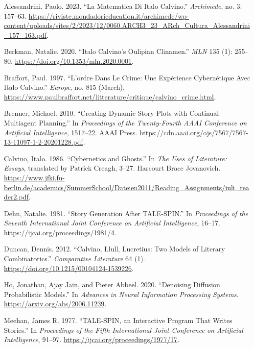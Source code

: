 \documentclass[
  11pt,
  letterpaper,
]{article}
\newlength{\cslhangindent}
\newenvironment{CSLReferences}[2] %
 {\begin{list}{}{%
  \setlength{\itemindent}{0pt}
  \setlength{\leftmargin}{0pt}
  \setlength{\parsep}{0pt}
  \ifodd #1
   \setlength{\leftmargin}{\cslhangindent}
   \setlength{\itemindent}{-1\cslhangindent}
  \fi
  \setlength{\itemsep}{#2\baselineskip}}}
 {\end{list}}
\begin{document}
\begin{CSLReferences}{1}{0}
Alessandrini, Paolo. 2023. {``La Matematica Di Italo Calvino.''}
\emph{Archimede}, no. 3: 157--63.
\url{https://riviste.mondadorieducation.it/archimede/wp-content/uploads/sites/2/2023/12/0060.ARCH3_23_ARch_Cultura_Alessandrini_157_163.pdf}.

Berkman, Natalie. 2020. {``Italo Calvino's Oulipian Clinamen.''}
\emph{MLN} 135 (1): 255--80.
\url{https://doi.org/10.1353/mln.2020.0001}.

Braffort, Paul. 1997. {``L'ordre Dans Le Crime: Une Expérience
Cybernétique Avec Italo Calvino.''} \emph{Europe}, no. 815 (March).
\url{https://www.paulbraffort.net/litterature/critique/calvino_crime.html}.

Brenner, Michael. 2010. {``Creating Dynamic Story Plots with Continual
Multiagent Planning.''} In \emph{Proceedings of the Twenty-Fourth AAAI
Conference on Artificial Intelligence}, 1517--22. AAAI Press.
\url{https://cdn.aaai.org/ojs/7567/7567-13-11097-1-2-20201228.pdf}.

Calvino, Italo. 1986. {``Cybernetics and Ghosts.''} In \emph{The Uses of
Literature: Essays}, translated by Patrick Creagh, 3--27. Harcourt Brace
Jovanovich.
\url{https://www.jfki.fu-berlin.de/academics/SummerSchool/Dateien2011/Reading_Assignments/iuli_reader2.pdf}.

Dehn, Natalie. 1981. {``Story Generation After TALE-SPIN.''} In
\emph{Proceedings of the Seventh International Joint Conference on
Artificial Intelligence}, 16--17.
\url{https://ijcai.org/proceedings/1981/4}.

Duncan, Dennis. 2012. {``Calvino, Llull, Lucretius: Two Models of
Literary Combinatorics.''} \emph{Comparative Literature} 64 (1).
\url{https://doi.org/10.1215/00104124-1539226}.

Ho, Jonathan, Ajay Jain, and Pieter Abbeel. 2020. {``Denoising Diffusion
Probabilistic Models.''} In \emph{Advances in Neural Information
Processing Systems}. \url{https://arxiv.org/abs/2006.11239}.

Meehan, James R. 1977. {``TALE-SPIN, an Interactive Program That Writes
Stories.''} In \emph{Proceedings of the Fifth International Joint
Conference on Artificial Intelligence}, 91--97.
\url{https://ijcai.org/proceedings/1977/17}.


\end{CSLReferences}
\end{document}
